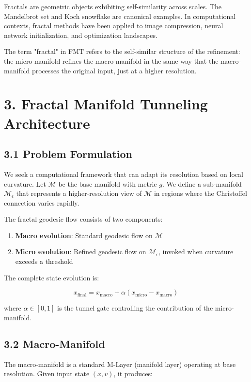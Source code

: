\documentclass[12pt]{article}
\begin{document}
Fractals are geometric objects exhibiting self-similarity across scales. The Mandelbrot set and Koch snowflake are canonical examples. In computational contexts, fractal methods have been applied to image compression, neural network initialization, and optimization landscapes.

The term "fractal" in FMT refers to the self-similar structure of the refinement: the micro-manifold refines the macro-manifold in the same way that the macro-manifold processes the original input, just at a higher resolution.

\section{3. Fractal Manifold Tunneling Architecture}

\subsection{3.1 Problem Formulation}

We seek a computational framework that can adapt its resolution based on local curvature. Let $\mathcal{M}$ be the base manifold with metric $g$. We define a sub-manifold $\mathcal{M}_\epsilon$ that represents a higher-resolution view of $\mathcal{M}$ in regions where the Christoffel connection varies rapidly.

The fractal geodesic flow consists of two components:
\begin{enumerate}
\item \textbf{Macro evolution}: Standard geodesic flow on $\mathcal{M}$
\item \textbf{Micro evolution}: Refined geodesic flow on $\mathcal{M}_\epsilon$, invoked when curvature exceeds a threshold
\end{enumerate}

The complete state evolution is:

\begin{equation}
x_{\text{final}} = x_{\text{macro}} + \alpha(x_{\text{micro}} - x_{\text{macro}})
\end{equation}

where $\alpha \in [0,1]$ is the tunnel gate controlling the contribution of the micro-manifold.

\subsection{3.2 Macro-Manifold}

The macro-manifold is a standard M-Layer (manifold layer) operating at base resolution. Given input state $(x, v)$, it produces:
\end{document}
